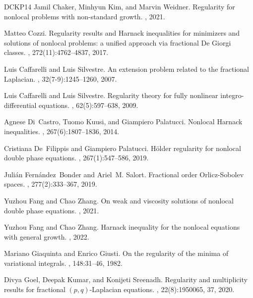\documentclass[11pt]{amsart}
\theoremstyle{plain}
\theoremstyle{definition}
\numberwithin{equation}{section}
\begin{document}
\begin{thebibliography}{DCKP14}
Jamil Chaker, Minhyun Kim, and Marvin Weidner.
\newblock Regularity for nonlocal problems with non-standard growth.
, 2021.

Matteo Cozzi.
\newblock Regularity results and {H}arnack inequalities for minimizers and
  solutions of nonlocal problems: a unified approach via fractional {D}e
  {G}iorgi classes.
, 272(11):4762--4837, 2017.

Luis Caffarelli and Luis Silvestre.
\newblock An extension problem related to the fractional {L}aplacian.
, 32(7-9):1245--1260, 2007.

Luis Caffarelli and Luis Silvestre.
\newblock Regularity theory for fully nonlinear integro-differential equations.
, 62(5):597--638, 2009.

Agnese Di~Castro, Tuomo Kuusi, and Giampiero Palatucci.
\newblock Nonlocal {H}arnack inequalities.
, 267(6):1807--1836, 2014.

Cristiana De~Filippis and Giampiero Palatucci.
\newblock H\"{o}lder regularity for nonlocal double phase equations.
, 267(1):547--586, 2019.

Juli\'{a}n Fern\'{a}ndez~Bonder and Ariel~M. Salort.
\newblock Fractional order {O}rlicz-{S}obolev spaces.
, 277(2):333--367, 2019.

Yuzhou Fang and Chao Zhang.
\newblock On weak and viscosity solutions of nonlocal double phase equations.
, 2021.

Yuzhou Fang and Chao Zhang.
\newblock Harnack inequality for the nonlocal equations with general growth.
, 2022.

Mariano Giaquinta and Enrico Giusti.
\newblock On the regularity of the minima of variational integrals.
, 148:31--46, 1982.

Divya Goel, Deepak Kumar, and Konijeti Sreenadh.
\newblock Regularity and multiplicity results for fractional
  {$(p,q)$}-{L}aplacian equations.
, 22(8):1950065, 37, 2020.


\end{thebibliography}
\end{document}
